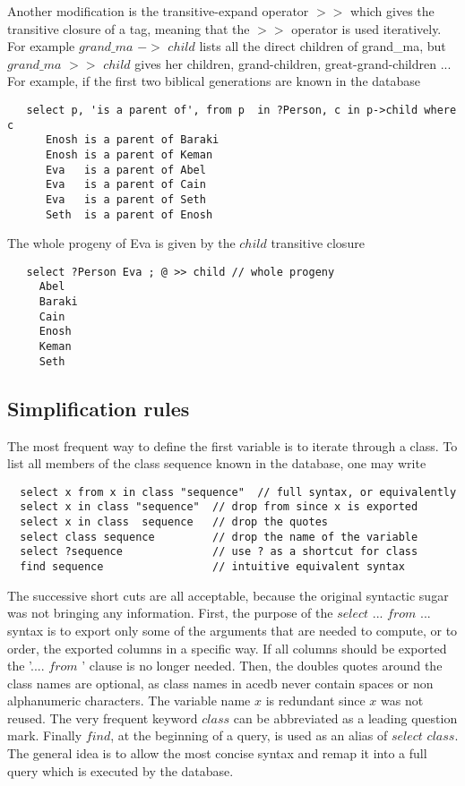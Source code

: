 \documentclass[11pt]{article}
\newcommand{\BL}{\begin{lstlisting}}
\begin{document}
Another modification is the transitive-expand operator $>>$
which gives the transitive closure of a tag, meaning that 
the $>>$ operator is used iteratively. 
For example $grand\_ma$ $->$ $child$ 
lists all the direct children of grand\_ma, 
but $grand\_ma$ $>>$ $child$ gives 
her children, grand-children, great-grand-children ... 
For example, if the first two biblical generations
are known in the database
\BL
   select p, 'is a parent of', from p  in ?Person, c in p->child where c
      Enosh	is a parent of Baraki
      Enosh	is a parent of Keman
      Eva	is a parent of Abel
      Eva	is a parent of Cain
      Eva	is a parent of Seth
      Seth	is a parent of Enosh
\end{lstlisting}
The whole progeny of Eva is given by the $child$ transitive closure
\BL
   select ?Person Eva ; @ >> child // whole progeny
     Abel
     Baraki
     Cain
     Enosh
     Keman
     Seth
\end{lstlisting}

\subsection{Simplification rules}

 The most frequent way to define the first variable is to iterate through a class. To list
all members of the class sequence known in the database, one may write
\BL
  select x from x in class "sequence"  // full syntax, or equivalently
  select x in class "sequence"  // drop from since x is exported
  select x in class  sequence   // drop the quotes
  select class sequence         // drop the name of the variable
  select ?sequence              // use ? as a shortcut for class
  find sequence                 // intuitive equivalent syntax
\end{lstlisting}
The successive short cuts are all acceptable, because the original syntactic sugar
was not bringing any information. First, 
the purpose of the $select$ ... $from$ ... syntax is to export only some of the arguments that are needed to compute,
 or to order, the exported columns in a specific way. If all columns should be exported the '.... $from$ ' clause 
is no longer needed. Then, the doubles quotes around the class names 
are optional, as class names in acedb never contain spaces or non alphanumeric characters. 
The variable name $x$ is redundant since $x$ was not reused. The very frequent keyword $class$
can be abbreviated as a leading question mark. Finally $find$, at the beginning of a query,
is used as an alias of $select$ $class$. The general idea is to allow the most concise syntax
and remap it into a full query which is executed by the database.
\end{document}
